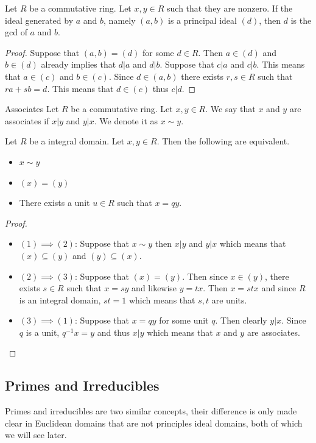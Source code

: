 \documentclass[a4paper]{article}
\begin{document}
\begin{prp}{}{} Let $R$ be a commutative ring. Let $x,y\in R$ such that they are nonzero. If the ideal generated by $a$ and $b$, namely $(a,b)$ is a principal ideal $(d)$, then $d$ is the gcd of $a$ and $b$. \tcbline
\begin{proof}
Suppose that $(a,b)=(d)$ for some $d\in R$. Then $a\in(d)$ and $b\in(d)$ already implies that $d|a$ and $d|b$. Suppose that $c|a$ and $c|b$. This means that $a\in(c)$ and $b\in(c)$. Since $d\in(a,b)$ there exists $r,s\in R$ such that $ra+sb=d$. This means that $d\in(c)$ thus $c|d$. 
\end{proof}
\end{prp}

\begin{defn}{Associates}{} Let $R$ be a commutative ring. Let $x,y\in R$. We say that $x$ and $y$ are associates if $x|y$ and $y|x$. We denote it as $x\sim y$. 
\end{defn}

\begin{prp}{}{} Let $R$ be a integral domain. Let $x,y\in R$. Then the following are equivalent. 
\begin{itemize}
\item $x\sim y$
\item $(x)=(y)$
\item There exists a unit $u\in R$ such that $x=qy$. 
\end{itemize} \tcbline
\begin{proof}
\begin{itemize}
\item $(1)\implies(2)$: Suppose that $x\sim y$ then $x|y$ and $y|x$ which means that $(x)\subseteq(y)$ and $(y)\subseteq(x)$. 
\item $(2)\implies(3)$: Suppose that $(x)=(y)$. Then since $x\in(y)$, there exists $s\in R$ such that $x=sy$ and likewise $y=tx$. Then $x=stx$ and since $R$ is an integral domain, $st=1$ which means that $s,t$ are units. 
\item $(3)\implies(1)$: Suppose that $x=qy$ for some unit $q$. Then clearly $y|x$. Since $q$ is a unit, $q^{-1}x=y$ and thus $x|y$ which means that $x$ and $y$ are associates. 
\end{itemize}
\end{proof}
\end{prp}

\subsection{Primes and Irreducibles}
Primes and irreducibles are two similar concepts, their difference is only made clear in Euclidean domains that are not principles ideal domains, both of which we will see later. 
\end{document}
